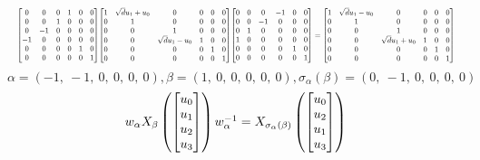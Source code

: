 \documentclass[11pt]{article}
\theoremstyle{definition}
\begin{document}
\[
\scaletoalign{\textwidth}{{\left[\begin{matrix}0 & 0 & 0 & 1 & 0 & 0\\0 & 0 & 1 & 0 & 0 & 0\\0 & -1 & 0 & 0 & 0 & 0\\-1 & 0 & 0 & 0 & 0 & 0\\0 & 0 & 0 & 0 & 1 & 0\\0 & 0 & 0 & 0 & 0 & 1\end{matrix}\right]} {\left[\begin{matrix}1 & \sqrt{d} u_{1} + u_{0} & 0 & 0 & 0 & 0\\0 & 1 & 0 & 0 & 0 & 0\\0 & 0 & 1 & 0 & 0 & 0\\0 & 0 & \sqrt{d} u_{1} - u_{0} & 1 & 0 & 0\\0 & 0 & 0 & 0 & 1 & 0\\0 & 0 & 0 & 0 & 0 & 1\end{matrix}\right]} {\left[\begin{matrix}0 & 0 & 0 & -1 & 0 & 0\\0 & 0 & -1 & 0 & 0 & 0\\0 & 1 & 0 & 0 & 0 & 0\\1 & 0 & 0 & 0 & 0 & 0\\0 & 0 & 0 & 0 & 1 & 0\\0 & 0 & 0 & 0 & 0 & 1\end{matrix}\right]} = {\left[\begin{matrix}1 & \sqrt{d} u_{1} - u_{0} & 0 & 0 & 0 & 0\\0 & 1 & 0 & 0 & 0 & 0\\0 & 0 & 1 & 0 & 0 & 0\\0 & 0 & \sqrt{d} u_{1} + u_{0} & 1 & 0 & 0\\0 & 0 & 0 & 0 & 1 & 0\\0 & 0 & 0 & 0 & 0 & 1\end{matrix}\right]}}
\]
\[
\alpha = \left( -1, \  -1, \  0, \  0, \  0, \  0\right), \beta = \left( 1, \  0, \  0, \  0, \  0, \  0\right), \sigma_{\alpha}(\beta) = \left( 0, \  -1, \  0, \  0, \  0, \  0\right)
\]
\[
\scaletoalign{\textwidth}{w_{\alpha} X_{\beta}\left(\left[\begin{matrix}u_{0}\\u_{1}\\u_{2}\\u_{3}\end{matrix}\right]\right) w_{\alpha}^{-1} = X_{\sigma_{\alpha}\left(\beta\right)}\left(\left[\begin{matrix}u_{0}\\u_{2}\\u_{1}\\u_{3}\end{matrix}\right]\right)}
\]
\end{document}
